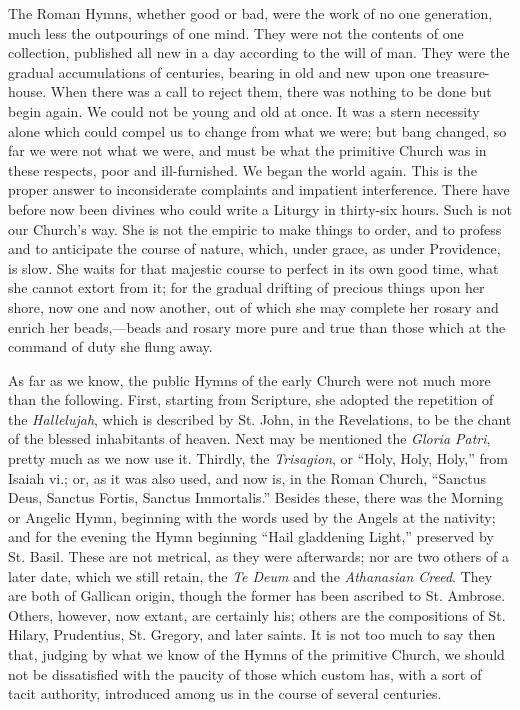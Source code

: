 The Roman Hymns, whether good or bad, were the
work of no one generation, much less the outpourings of one mind. They
were not the contents of one collection, published all new in a day
according to the will of man. They were the gradual accumulations of
centuries, bearing in old and new upon one treasure-house. When there
was a call to reject them, there was nothing to be done but begin
again. We could not be young and old at once. It was a stern necessity
alone which could compel us to change from what we were; but bang
changed, so far we were not what we were, and must be what the
primitive Church was in these respects, poor and ill-furnished. We
began the world again. This is the proper answer to inconsiderate
complaints and impatient interference. There have before now been
divines who could write a Liturgy in thirty-six hours. Such is not our
Church's way. She is not the empiric to make things to order, and to
profess and to anticipate the course of nature, which, under grace, as
under Providence, is slow. She waits for that majestic course to
perfect in its own good time, what she cannot extort from it; for the
gradual drifting of precious things upon her shore, now one and now
another, out of which she may complete her rosary and enrich her
beads,—beads and rosary more pure and true than those which at the
command of duty she flung away.

As far as we know, the public Hymns of the early
Church were not much more than the following. First, starting from
Scripture, she adopted the repetition of the \emph{Hallelujah}, which
is described by St. John, in the Revelations, to be the chant of the
blessed inhabitants of heaven. Next may be mentioned the \emph{Gloria
Patri}, pretty much as we now use it. Thirdly, the \emph{Trisagion},
or ``Holy, Holy, Holy,'' from Isaiah vi.; or, as it was also used, and
now is, in the Roman Church, ``Sanctus Deus, Sanctus Fortis, Sanctus
Immortalis.'' Besides these, there was the Morning or Angelic Hymn,
beginning with the words used by the Angels at the nativity; and for
the evening the Hymn beginning ``Hail gladdening Light,'' preserved by
St. Basil. These are not metrical, as they were afterwards; nor are
two others of a later date, which we still retain, the \emph{Te Deum}
and the \emph{Athanasian Creed}. They are both of Gallican origin,
though the former has been ascribed to St. Ambrose. Others, however,
now extant, are certainly his; others are the compositions of St.
Hilary, Prudentius, St. Gregory, and later saints. It is not
too much to say then that, judging by what we know of the Hymns of the
primitive Church, we should not be dissatisfied with the paucity of
those which custom has, with a sort of tacit authority, introduced
among us in the course of several centuries.

